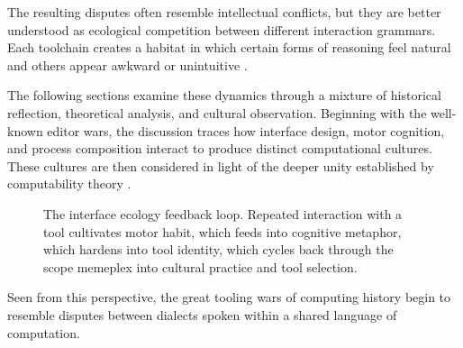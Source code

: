 \documentclass[11pt]{article}
\theoremstyle{definition}
\begin{document}
The resulting disputes often resemble intellectual conflicts, but they
are better understood as ecological competition between different
interaction grammars. Each toolchain creates a habitat in which certain
forms of reasoning feel natural and others appear awkward or
unintuitive \cite{brooks1975}.

The following sections examine these dynamics through a mixture of
historical reflection, theoretical analysis, and cultural observation.
Beginning with the well-known editor wars, the discussion traces how
interface design, motor cognition, and process composition interact to
produce distinct computational cultures. These cultures are then
considered in light of the deeper unity established by computability
theory \cite{church1936,turing1936}.

\begin{figure}[h]
\centering
{}
\caption{The interface ecology feedback loop. Repeated interaction with a
tool cultivates motor habit, which feeds into cognitive metaphor, which
hardens into tool identity, which cycles back through the scope memeplex
into cultural practice and tool selection.}
\label{fig:ecology_loop}
\end{figure}

Seen from this perspective, the great tooling wars of computing history
begin to resemble disputes between dialects spoken within a shared
language of computation.
\end{document}
